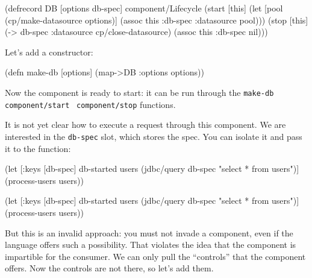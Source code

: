 \else

\begin{english}
  \begin{clojure}
(defrecord DB [options db-spec]
  component/Lifecycle
  (start [this]
    (let [pool (cp/make-datasource options)]
      (assoc this :db-spec {:datasource pool})))
  (stop [this]
    (-> db-spec :datasource cp/close-datasource)
    (assoc this :db-spec nil)))
  \end{clojure}
\end{english}

\fi

\noindent
Let's add a constructor:

\begin{english}
  \begin{clojure}
(defn make-db [options]
  (map->DB {:options options}))
  \end{clojure}
\end{english}

Now the component is ready to start: it can be run through the \verb|make-db|~\arr{} \texttt{component\-/start}~\arr{} \verb|component/stop| functions.

It is not yet clear how to execute a request through this component. We are interested in the \verb|db-spec| slot, which stores the spec. You can isolate it and pass it to the function:

\ifnarrow

\begin{english}
  \begin{clojure}
(let [{:keys [db-spec]} db-started
      users (jdbc/query db-spec
              "select * from users")]
  (process-users users))
  \end{clojure}
\end{english}

\else

\begin{english}
  \begin{clojure}
(let [{:keys [db-spec]} db-started
      users (jdbc/query db-spec "select * from users")]
  (process-users users))
  \end{clojure}
\end{english}

\fi

But this is an invalid approach: you must not invade a component, even if the language offers such a possibility. That violates the idea that the component is impartible for the consumer. We can only pull the ``controls'' that the component offers. Now the controls are not there, so let's add them.

